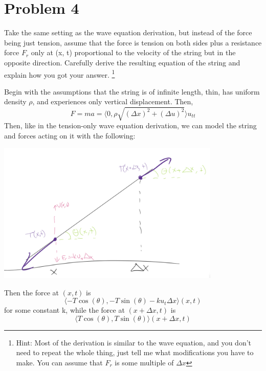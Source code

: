 \documentclass[12pt]{article}
\begin{document}
\section*{Problem 4}
Take the same setting as the wave equation derivation, but instead of the force being just tension, assume that the force is tension on both sides plus a resistance force $F_r$ only at (x, t) proportional to the velocity of the string but in the opposite direction. Carefully derive the resulting equation of the string and explain how you got your answer. \footnote{Hint: Most of the derivation is similar to the wave equation, and you don't need to repeat the whole thing, just tell me what modifications you have to make. You can assume that $F_r$ is some multiple of $\Delta x$}

\color{blue}
Begin with the assumptions that the string is of infinite length, thin, has uniform density $\rho$, and experiences only vertical displacement. Then,
\[F = ma = \langle0, \rho \sqrt{(\Delta x)^2 + (\Delta u)^2}\rangle u_{tt}\] 
Then, like in the tension-only wave equation derivation, we can model the string and forces acting on it with the following:

\includegraphics[width=0.8\textwidth]{Images/string force.png}

Then the force at $(x, t)$ is 
\[\langle -T\cos(\theta), -T\sin(\theta) - ku_t\Delta x\rangle(x, t)\]
for some constant k, while the force at $(x + \Delta x, t)$ is 
\[\langle T \cos(\theta), T\sin(\theta)\rangle(x + \Delta x, t)\]
\end{document}
